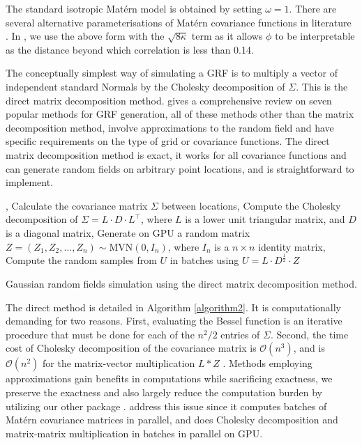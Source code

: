 \documentclass[article,nojss]{jss}\usepackage[]{graphicx}\usepackage[]{color}
\begin{document}
The standard isotropic Mat\'ern model is obtained by setting $\omega = 1$.
There are several alternative parameterisations of Mat\'ern covariance functions in literature  \citep[see][]{haskard2007anisotropic}. In , we use the above form with the $\sqrt{8\kappa}$ term as it allows $\phi$ to be interpretable as the distance beyond which correlation is less than 0.14.

The conceptually simplest way of simulating a GRF is to multiply a vector of independent standard Normals by the Cholesky decomposition of $\Sigma$.  This is the direct matrix decomposition method.  
\cite{LiuandLi2019} gives a comprehensive review on seven popular methods for GRF generation, %
all of these methods other than the matrix decomposition method, involve approximations to the random field and have specific requirements on the type of grid or covariance functions. The direct matrix decomposition method is exact, it works for all covariance functions and can generate random fields on arbitrary point locations, and is straightforward to implement. 



\begin{algorithm}[H]
, Calculate the covariance matrix $\Sigma$ between locations, Compute the Cholesky decomposition of $\Sigma = L \cdot D \cdot L^\top$, where $L$ is a lower unit triangular matrix, and $D$ is a diagonal matrix, Generate on GPU a random matrix $Z=(Z_1, Z_2, \dots, Z_n) \sim \text{MVN}(0,I_n)$, where $I_n$ is a $n \times n$ identity matrix, Compute the random samples from $U$ in batches using $U = L \cdot D^{\frac{1}{2}} \cdot Z$ \;
 \caption{Gaussian random fields simulation using the direct matrix decomposition method.}
 \label{algorithm2}
\end{algorithm}

The direct method is detailed in Algorithm \ref{algorithm2}.  It is computationally demanding for two reasons.  First, evaluating the Bessel function is an iterative procedure that must be done for each of the $n^2/2$ entries of $\Sigma$.  Second, the time cost of Cholesky decomposition of the covariance matrix is $\mathcal{O}(n^3)$,  and is $\mathcal{O}(n^2)$ for the matrix-vector multiplication $L*Z$ \citep{LiuandLi2019}. Methods employing approximations gain benefits in computations while sacrificing exactness, we preserve the exactness and also largely reduce the computation burden by utilizing our other  package .  address this issue since it computes batches of Mat\'ern covariance matrices in parallel, and does Cholesky decomposition and matrix-matrix multiplication in batches in parallel on GPU. 
\end{document}
